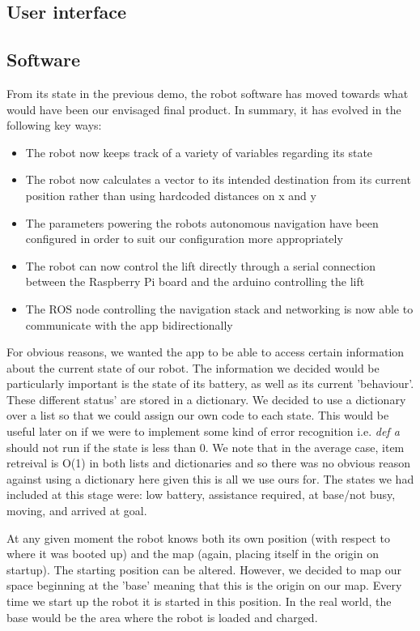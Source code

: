 \documentclass{article}
\begin{document}
\subsection{User interface}

\subsection{Software}

From its state in the previous demo, the robot software has moved towards what would have been our envisaged final product. In summary, it has evolved in the following key ways:

\begin{itemize}
  \item The robot now keeps track of a variety of variables regarding its state
  \item The robot now calculates a vector to its intended destination from its current position rather than using hardcoded distances on x and y
  \item The parameters powering the robots autonomous navigation have been configured in order to suit our configuration more appropriately
  \item The robot can now control the lift directly through a serial connection between the Raspberry Pi board and the arduino controlling the lift
  \item The ROS node controlling the navigation stack and networking is now able to communicate with the app bidirectionally
\end{itemize}

For obvious reasons, we wanted the app to be able to access certain information about the current state of our robot. The information we decided would be particularly important is the state of its battery, as well as its current 'behaviour'. These different status' are stored in a dictionary. We decided to use a dictionary over a list so that we could assign our own code to each state. This would be useful later on if we were to implement some kind of error recognition i.e. {\it def a} should not run if the state is less than 0. We note that in the average case, item retreival is O(1) in both lists and dictionaries and so there was no obvious reason against using a dictionary here given this is all we use ours for. The states we had included at this stage were: low battery, assistance required, at base/not busy, moving, and arrived at goal.

At any given moment the robot knows both its own position (with respect to where it was booted up) and the map (again, placing itself in the origin on startup). The starting position can be altered. However, we decided to map our space beginning at the 'base' meaning that this is the origin on our map. Every time we start up the robot it is started in this position. In the real world, the base would be the area where the robot is loaded and charged.
\end{document}
